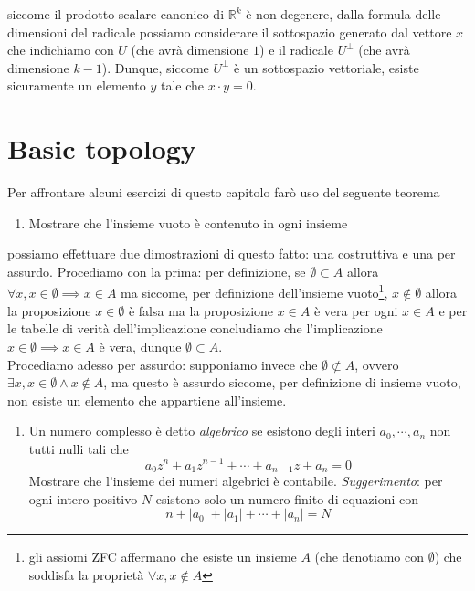 \documentclass{report}
\begin{document}
\begin{mysolution}
siccome il prodotto scalare canonico di $\mathbb{R}^k$ è non degenere, dalla formula delle dimensioni del radicale possiamo considerare il sottospazio generato dal vettore $x$ che indichiamo con $U$ (che avrà dimensione $1$) e il radicale $U^{\perp}$ (che avrà dimensione $k-1$). Dunque, siccome $U^{\perp}$ è un sottospazio vettoriale, esiste sicuramente un elemento $y$ tale che $x \cdot y = 0$.
\end{mysolution}

\chapter{Basic topology}
Per affrontare alcuni esercizi di questo capitolo farò uso del seguente teorema
\begin{enumerate}[label=\protect\circled{\arabic*}]
	\item Mostrare che l'insieme vuoto è contenuto in ogni insieme
\end{enumerate}
\begin{mysolution}
	possiamo effettuare due dimostrazioni di questo fatto: una costruttiva e una per assurdo. Procediamo con la prima: per definizione, se $\emptyset \subset A$ allora $\forall x, x \in \emptyset \implies x \in A$ ma siccome, per definizione dell'insieme vuoto\footnote{gli assiomi ZFC affermano che esiste un insieme $A$ (che denotiamo con $\emptyset$) che soddisfa la proprietà $\forall x, x \not\in A$}, $x \not\in \emptyset$ allora la proposizione $x \in \emptyset$ è falsa ma la proposizione $x \in A$ è vera per ogni $x \in A$ e per le tabelle di verità dell'implicazione concludiamo che l'implicazione $x \in \emptyset \implies x \in A$ è vera, dunque $\emptyset \subset A$. \\
	Procediamo adesso per assurdo: supponiamo invece che $\emptyset \not\subset A$, ovvero $\exists x, x \in \emptyset \wedge x \not\in A$, ma questo è assurdo siccome, per definizione di insieme vuoto, non esiste un elemento che appartiene all'insieme.
\end{mysolution}
\begin{enumerate}[resume, label=\protect\circled{\arabic*}]
	\item Un numero complesso è detto \emph{algebrico} se esistono degli interi $a_0, \cdots , a_n$ non tutti nulli tali che
	$$
		a_0z^n + a_1 z^{n-1} + \cdots + a_{n-1}z + a_n = 0
	$$
	Mostrare che l'insieme dei numeri algebrici è contabile. \textit{Suggerimento}: per ogni intero positivo $N$ esistono solo un numero finito di equazioni con
	$$
		n + |a_0| + |a_1| + \cdots + |a_n| = N
	$$
\end{enumerate}
\end{document}
